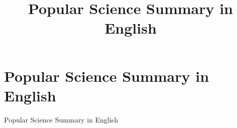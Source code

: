 
\title{Popular Science Summary in English}
\chapter[Popular Science Summary in English]{\texorpdfstring{%
Popular Science Summary in English}{%
Popular Science Summary in English}}

Popular Science Summary in English